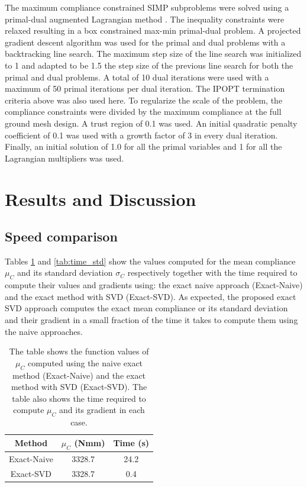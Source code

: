     The maximum compliance constrained SIMP subproblems were solved using a primal-dual augmented Lagrangian method \citep{Bertsekas1996}. The inequality constraints were relaxed resulting in a box constrained max-min primal-dual problem. A projected gradient descent algorithm was used for the primal and dual problems with a backtracking line search. The maximum step size of the line search was initialized to 1 and adapted to be 1.5 the step size of the previous line search for both the primal and dual problems. A total of 10 dual iterations were used with a maximum of 50 primal iterations per dual iteration. The IPOPT termination criteria above was also used here. To regularize the scale of the problem, the compliance constraints were divided by the maximum compliance at the full ground mesh design. A trust region of 0.1 was used. An initial quadratic penalty coefficient of 0.1 was used with a growth factor of 3 in every dual iteration. Finally, an initial solution of 1.0 for all the primal variables and 1 for all the Lagrangian multipliers was used.

\section{Results and Discussion} \label{sec:results}

  \subsection{Speed comparison}

    Tables \ref{tab:time_mean} and \ref{tab:time_std} show the values computed for the mean compliance $\mu_C$ and its standard deviation $\sigma_C$ respectively together with the time required to compute their values and gradients using: the exact naive approach (Exact-Naive) and the exact method with SVD (Exact-SVD). As expected, the proposed exact SVD approach computes the exact mean compliance or its standard deviation and their gradient in a small fraction of the time it takes to compute them using the naive approaches.

    \begin{table}[h!]
     \centering
     \caption{The table shows the function values of $\mu_C$ computed using the naive exact method (Exact-Naive) and the exact method with SVD (Exact-SVD). The table also shows the time required to compute $\mu_C$ and its gradient in each case.}
     \begin{tabular}{|c|c|c|}
      \hline
      Method & $\mu_C$ (Nmm) & Time (s) \\
      \hline
      \hline
      Exact-Naive & 3328.7 & 24.2 \\
      \hline
      Exact-SVD & 3328.7 & 0.4 \\
      \hline
     \end{tabular}
     \label{tab:time_mean}
    \end{table}

